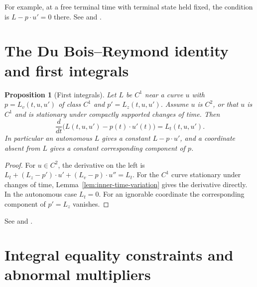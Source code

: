 \documentclass[11pt,oneside,openany]{book}
\theoremstyle{plain}
\newtheorem{proposition}[theorem]{Proposition}
\theoremstyle{definition}
\theoremstyle{remark}
\begin{document}
For example, at a free terminal time with terminal state held
fixed, the condition is \(L-p\cdot u'=0\) there.
See \cite[Section 2.3.5]{Liberzon} and
\cite[Section 2.2]{Dacorogna}.

\section{The Du Bois--Reymond identity and first integrals}
\label{v07-03}

\begin{proposition}[First integrals]
\label{prop:beltrami}
Let \(L\) be \(C^1\) near a curve \(u\) with
\(p=L_v(t,u,u')\) of class \(C^1\) and \(p'=L_z(t,u,u')\).
Assume \(u\) is \(C^2\), or that \(u\) is \(C^1\) and is
stationary under compactly supported changes of time.
Then
\[
 \frac{d}{dt}\bigl(L(t,u,u')-p(t)\cdot u'(t)\bigr)
     =L_t(t,u,u').
\]
In particular an autonomous \(L\) gives a constant
\(L-p\cdot u'\), and a coordinate absent from \(L\) gives a
constant corresponding component of \(p\).
\end{proposition}
\begin{proof}
For \(u\in C^2\), the derivative on the left is
\(L_t+(L_z-p')\cdot u'+(L_v-p)\cdot u''=L_t\).
For the \(C^1\) curve stationary under changes of time,
Lemma~\ref{lem:inner-time-variation} gives the derivative
directly. In the autonomous case \(L_t=0\).
For an ignorable coordinate the corresponding component of
\(p'=L_z\) vanishes.
\end{proof}

See \cite[Theorem 2.11]{Dacorogna} and
\cite[Section 2.3.4]{Liberzon}.


\section{Integral equality constraints and abnormal multipliers}
\label{v07-04}
\end{document}
